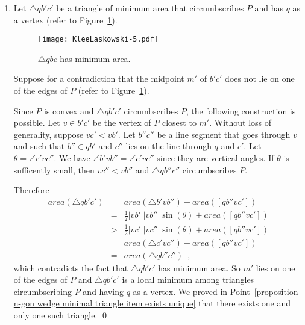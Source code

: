\documentclass[11pt, oneside]{article}
\begin{document}
\begin{enumerate}
\item Let $\triangle qb'c'$ be a triangle 
of minimum area that circumbscribes $P$
and has $q$ as a vertex
(refer to Figure~\ref{figure KleeLaskowski-5}).
\begin{figure}
\centering
\texttt{[image: KleeLaskowski-5.pdf]}
\caption{$\triangle qbc$ has minimum area.\label{figure KleeLaskowski-5}}
\end{figure}
Suppose for a contradiction
that the midpoint $m'$ of $b'c'$
does not lie on one of the edges of $P$
(refer to Figure~\ref{figure KleeLaskowski-5}).

Since $P$ is convex
and $\triangle qb'c'$ circumbscribes $P$,
the following construction is possible.
Let $v \in b'c'$ be the vertex of $P$ closest to $m'$.
Without loss of generality, 
suppose $vc' < vb'$.
Let $b''c''$ be a line segment that goes through $v$
and such that $b'' \in qb'$
and $c''$ lies on the line through $q$ and $c'$.
Let $\theta = \angle c'vc''$.
We have $\angle b'vb'' = \angle c'vc''$ since they are vertical angles.
If $\theta$ is sufficently small,
then $vc'' < vb''$
and $\triangle qb''c''$ circumbscribes $P$.

Therefore
\begin{eqnarray*}
area(\triangle qb'c') &=& area(\triangle b'vb'') + area([qb''vc']) \\
&=& \frac{1}{2}|vb'||vb''|\sin(\theta) + area([qb''vc']) \\
&>& \frac{1}{2}|vc'||vc''|\sin(\theta) + area([qb''vc']) \\
&=& area(\triangle c'vc'') + area([qb''vc']) \\
&=& area(\triangle qb''c'') \enspace,
\end{eqnarray*}
which contradicts the fact that $\triangle qb'c'$ has minimum area.
So $m'$ lies on one of the edges of $P$
and $\triangle qb'c'$ is a local minimum
among triangles circumbscribing $P$
and having $q$ as a vertex.
We proved in Point~\ref{proposition n-gon wedge minimal triangle item exists unique}
that there exists one and only one such triangle.
\qed
\end{enumerate}
\end{document}

